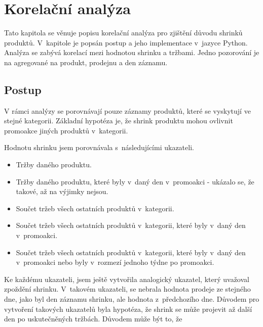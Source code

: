 \newpage
\chapter{Korelační analýza}

Tato kapitola se věnuje popisu korelační analýza pro zjištění důvodu shrinků produktů. V~kapitole je popsán postup a jeho implementace v~jazyce Python. Analýza se zabývá korelací mezi hodnotou shrinku a tržbami. Jedno pozorování je na agregované na produkt, prodejnu a den záznamu.  




\section{Postup}
\label{sec:korpostup}
V rámci analýzy se porovnávají pouze záznamy produktů, které se vyskytují ve stejné kategorii. Základní hypotéza je, že shrink produktu mohou ovlivnit promoakce jiných produktů v~kategorii.

Hodnotu shrinku jsem porovnávala s~následujícími ukazateli. 
\begin{itemize}
    \itemsep0em 
    \item Tržby daného produktu.
    \item Tržby daného produktu, které byly v~daný den v~promoakci - ukázalo se, že takové, až na výjimky nejsou.
    \item Součet tržeb všech ostatních produktů v~kategorii.
    \item Součet tržeb všech ostatních produktů v~kategorii, které byly v~daný den v~promoakci.
    \item Součet tržeb všech ostatních produktů v~kategorii, které byly v~daný den v~promoakci nebo byly v~rozmezí jednoho týdne po promoakci.
\end{itemize}

Ke každému ukazateli, jsem ještě vytvořila analogický ukazatel, který uvažoval zpoždění shrinku. V~takovém ukazateli, se nebrala hodnota prodeje ze stejného dne, jako byl den záznamu shrinku, ale hodnota z~předchozího dne. Důvodem pro vytvoření takových ukazatelů byla hypotéza, že shrink se může projevit až další den po uskutečněných tržbách. Důvodem může být to, že 

